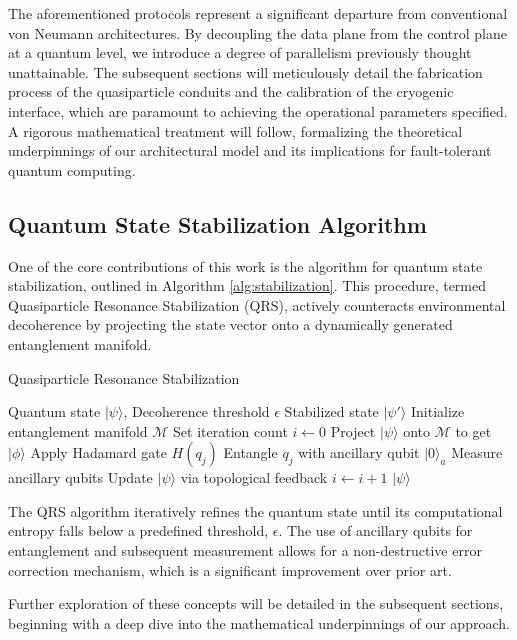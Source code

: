 The aforementioned protocols represent a significant departure from conventional von Neumann architectures. By decoupling the data plane from the control plane at a quantum level, we introduce a degree of parallelism previously thought unattainable. The subsequent sections will meticulously detail the fabrication process of the quasiparticle conduits and the calibration of the cryogenic interface, which are paramount to achieving the operational parameters specified. A rigorous mathematical treatment will follow, formalizing the theoretical underpinnings of our architectural model and its implications for fault-tolerant quantum computing.

\subsection{Quantum State Stabilization Algorithm}
One of the core contributions of this work is the algorithm for quantum state stabilization, outlined in Algorithm \ref{alg:stabilization}. This procedure, termed Quasiparticle Resonance Stabilization (QRS), actively counteracts environmental decoherence by projecting the state vector onto a dynamically generated entanglement manifold.

\begin{algorithm}[h!]
\caption{Quasiparticle Resonance Stabilization}
\label{alg:stabilization}
\begin{algorithmic}[1]
\REQUIRE Quantum state $|\psi\rangle$, Decoherence threshold $\epsilon$
\ENSURE Stabilized state $|\psi'\rangle$
\STATE Initialize entanglement manifold $\mathcal{M}$
\STATE Set iteration count $i \leftarrow 0$
    \STATE Project $|\psi\rangle$ onto $\mathcal{M}$ to get $|\phi\rangle$
            \STATE Apply Hadamard gate $H(q_j)$
        \ELSE
            \STATE Entangle $q_j$ with ancillary qubit $|0\rangle_a$
        \ENDIF
    \ENDFOR
    \STATE Measure ancillary qubits
    \STATE Update $|\psi\rangle$ via topological feedback
    \STATE $i \leftarrow i + 1$
\ENDWHILE
\RETURN $|\psi\rangle$
\end{algorithmic}
\end{algorithm}

The QRS algorithm iteratively refines the quantum state until its computational entropy falls below a predefined threshold, $\epsilon$. The use of ancillary qubits for entanglement and subsequent measurement allows for a non-destructive error correction mechanism, which is a significant improvement over prior art.

Further exploration of these concepts will be detailed in the subsequent sections, beginning with a deep dive into the mathematical underpinnings of our approach.
